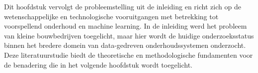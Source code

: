 




Dit hoofdstuk vervolgt de probleemstelling uit de inleiding en richt zich op de wetenschappelijke en technologische vooruitgangen met betrekking tot voorspellend onderhoud en machine learning. In de inleiding werd het probleem van kleine bouwbedrijven toegelicht, maar hier wordt de huidige onderzoeksstatus binnen het bredere domein van data-gedreven onderhoudssystemen onderzocht. Deze literatuurstudie biedt de theoretische en methodologische fundamenten voor de benadering die in het volgende hoofdstuk wordt toegelicht.

\newpage

